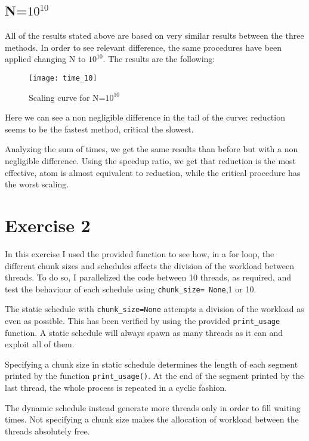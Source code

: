 \documentclass[10pt,a4paper]{article}
\begin{document}
\subsection{N=$10^{10}$}

All of the results stated above are based on very similar results between the three methods. In order to see relevant difference, the same procedures have been applied changing N to $10^{10}$. The results are the following:

\begin{figure}[h!]
	\centering
	\texttt{[image: time\_10]}
	\caption*{Scaling curve for N=$10^{10}$}
	\label{fig:time10}
\end{figure}

Here we can see a non negligible difference in the tail of the curve: reduction seems to be the fastest method, critical the slowest.

Analyzing the sum of times, we get the same results than before but with a non negligible difference. Using the speedup ratio, we get that reduction is the most effective, atom is almost equivalent to reduction, while the critical procedure has the worst scaling.

\section{Exercise 2}

In this exercise I used the provided function to see how, in a for loop, the different chunk sizes and schedules affects the division of the workload between threads. To do so, I parallelized the code between 10 threads, as required, and test the behaviour of each schedule using \texttt{chunk\_size= None},1 or 10.

The static schedule with \texttt{chunk\_size=None} attempts a division of the workload as even as possible. This has been verified by using the provided \texttt{print\_usage} function. A static schedule will always spawn as many threads as it can and exploit all of them.

Specifying a chunk size in static schedule determines the length of each segment printed by the function \texttt{print\_usage()}. At the end of the segment printed by the last thread, the whole process is repeated in a cyclic fashion.

The dynamic schedule instead generate more threads only in order to fill waiting times. Not specifying a chunk size makes the allocation of workload between the threads absolutely free.
\end{document}
